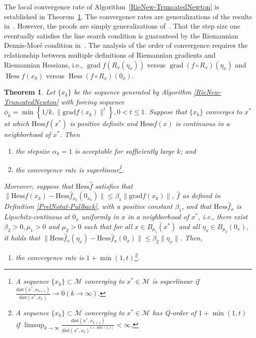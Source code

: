 \documentclass[11pt]{article}
\newtheorem{theorem}{Theorem}[section]
\numberwithin{equation}{section}
\DeclareMathOperator{\Hess}{\mathrm{Hess}}
\DeclareMathOperator{\grad}{\mathrm{grad}}
\begin{document}
The local convergence rate of Algorithm~\ref{RieNew-TruncatedNewton} is established in Theorem~\ref{RieNew-OrderOfConv}. The convergence rates are generalizations of the results in~\cite{dembo_truncated-newton_1983}. However, the proofs are simply generalizations of~\cite{dembo_truncated-newton_1983}. That the step size one eventually satisfies the line search condition is guaranteed by the Riemannian Dennis-Mor{\'e} condition in~\cite{ring_optimization_2012}. The analysis of the order of convergence requires the relationship between multiple definitions of Riemannian gradients and Riemannian Hessians, i.e., $\grad f(R_x(\eta_x))$ versus $\grad (f \circ R_x) (\eta_x)$ and $\Hess f(x_k)$ versus $\Hess (f \circ R_x)(0_x)$.
\begin{theorem}
	\label{RieNew-OrderOfConv} 
  Let $\{x_k\}$ be the sequence generated by Algorithm \ref{RieNew-TruncatedNewton} with forcing sequence 
  $ 
  \phi_k = \min\left\{1/k,\|\mathrm{grad}f(x_k)\|^t\right\}, 0 < t \le 1 .
  $
  Suppose that $\{x_k\}$ converges to $x^*$ at which $\mathrm{Hess}f(x^*)$ is positive definite and $\mathrm{Hess}f(x)$ is continuous in a neighborhood of $x^*$. Then 
  \begin{enumerate}
    \item[1.]  the stepsize $\alpha_k=1$ is acceptable for sufficiently large $k$; and 
    \item[2.] the convergence rate is superlinear\footnote{A sequence $\{x_k\}\subset \mathcal{M}$ converging to $x^*\in\mathcal{M}$ is superlinear if $ \frac{\mathrm{dist}(x^*,x_{k+1})}{\mathrm{dist}(x^*,x_k)} \rightarrow 0(k \rightarrow \infty). $ }.
  \end{enumerate}
Moreover, suppose that $\mathrm{Hess}\hat{f}$ satisfies that $\|\mathrm{Hess}f(x_k)- \mathrm{Hess}\hat{f}_{x_k}(0_{x_k})\|\le \beta_1 \|\mathrm{grad}f(x_k)\|$, $\hat{f}$ as defined in Definition \ref{PrelNotat-Pullback}, with a positive constant $\beta_1$, and that $\mathrm{Hess}\hat{f}_x$ is Lipschitz-continous at $0_x$ uniformly in $x$ in a neighborhood of $x^*$, i.e., there exist $\beta_2>0,\mu_1 > 0$ and $\mu_2>0$ such that for all $x\in B_{\mu_{1}}(x^*)$ and all $\eta_x\in B_{\mu_2}(0_x)$, it holds that $\|\mathrm{Hess}\hat{f}_x(\eta_x)-\mathrm{Hess}\hat{f}_x(0_x)\|\le \beta_2\|\eta_x\|$. Then, 
\begin{enumerate}
	\item[3.] the convergence rate is $1+\min(1,t)$\footnote{A sequence $\{x_k\}\subset \mathcal{M}$ converging to $x^*\in\mathcal{M}$ has Q-order of $1+\min(1,t)$ if $\limsup_{k \rightarrow \infty} \frac{\mathrm{dist}(x^*,x_{k+1})}{\mathrm{dist}(x^*,x_k)^{1+\min(1,t)}} <\infty. $}.
\end{enumerate}
\end{theorem}
\end{document}
